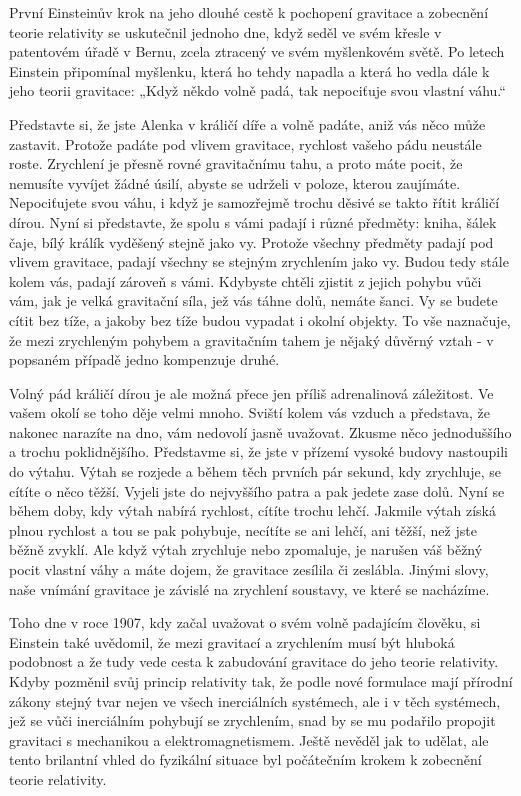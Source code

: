   První Einsteinův krok na jeho dlouhé cestě k pochopení gravitace a zobecnění teorie relativity se
  uskutečnil jednoho dne, když seděl ve svém křesle v patentovém úřadě v Bernu, zcela ztracený ve
  svém myšlenkovém světě. Po letech Einstein připomínal myšlenku, která ho tehdy napadla a která ho
  vedla dále k jeho teorii gravitace: „Když někdo volně padá, tak nepociťuje svou vlastní váhu.“
  
  Představte si, že jste Alenka v králičí díře a volně padáte, aniž vás něco může zastavit. Protože
  padáte pod vlivem gravitace, rychlost vašeho pádu neustále roste. Zrychlení je přesně rovné
  gravitačnímu tahu, a proto máte pocit, že nemusíte vyvíjet žádné úsilí, abyste se udrželi v
  poloze, kterou zaujímáte. Nepociťujete svou váhu, i když je samozřejmě trochu děsivé se takto
  řítit králičí dírou. Nyní si představte, že spolu s vámi padají i různé předměty: kniha, šálek
  čaje, bílý králík vyděšený stejně jako vy. Protože všechny předměty padají pod vlivem gravitace,
  padají všechny se stejným zrychlením jako vy. Budou tedy stále kolem vás, padají zároveň s vámi.
  Kdybyste chtěli zjistit z jejich pohybu vůči vám, jak je velká gravitační síla, jež vás táhne
  dolů, nemáte šanci. Vy se budete cítit bez tíže, a jakoby bez tíže budou vypadat i okolní objekty.
  To vše naznačuje, že mezi zrychleným pohybem a gravitačním tahem je nějaký důvěrný vztah - v
  popsaném případě jedno kompenzuje druhé. 
  
  Volný pád králičí dírou je ale možná přece jen příliš adrenalinová záležitost. Ve vašem okolí se
  toho děje velmi mnoho. Sviští kolem vás vzduch a představa, že nakonec narazíte na dno, vám
  nedovolí jasně uvažovat. Zkusme něco jednoduššího a trochu poklidnějšího. Představme si, že jste v
  přízemí vysoké budovy nastoupili do výtahu. Výtah se rozjede a během těch prvních pár sekund, kdy
  zrychluje, se cítíte o něco těžší. Vyjeli jste do nejvyššího patra a pak jedete zase dolů. Nyní se
  během doby, kdy výtah nabírá rychlost, cítíte trochu lehčí. Jakmile výtah získá plnou rychlost a
  tou se pak pohybuje, necítíte se ani lehčí, ani těžší, než jste běžně zvyklí. Ale když výtah
  zrychluje nebo zpomaluje, je narušen váš běžný pocit vlastní váhy a máte dojem, že gravitace
  zesílila či zeslábla. Jinými slovy, naše vnímání gravitace je závislé na zrychlení soustavy, ve
  které se nacházíme. 
  
  Toho dne v roce 1907, kdy začal uvažovat o svém volně padajícím člověku, si Einstein také
  uvědomil, že mezi gravitací a zrychlením musí být hluboká podobnost a že tudy vede cesta k
  zabudování gravitace do jeho teorie relativity. Kdyby pozměnil svůj princip relativity tak, že
  podle nové formulace mají přírodní zákony stejný tvar nejen ve všech inerciálních systémech, ale i
  v těch systémech, jež se vůči inerciálním pohybují se zrychlením, snad by se mu podařilo propojit
  gravitaci s mechanikou a elektromagnetismem. Ještě nevěděl jak to udělat, ale tento brilantní
  vhled do fyzikální situace byl počátečním krokem k zobecnění teorie relativity. 
  
